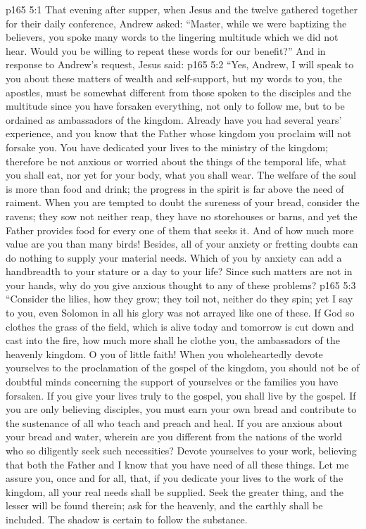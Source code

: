 \vs p165 5:1 That evening after supper, when Jesus and the twelve gathered together for their daily conference, Andrew asked: “Master, while we were baptizing the believers, you spoke many words to the lingering multitude which we did not hear. Would you be willing to repeat these words for our benefit?” And in response to Andrew’s request, Jesus said:
\pc \vs p165 5:2 \textcolor{ubdarkred}{“Yes, Andrew, I will speak to you about these matters of wealth and self\hyp{}support, but my words to you, the apostles, must be somewhat different from those spoken to the disciples and the multitude since you have forsaken everything, not only to follow me, but to be ordained as ambassadors of the kingdom. Already have you had several years’ experience, and you know that the Father whose kingdom you proclaim will not forsake you. You have dedicated your lives to the ministry of the kingdom; therefore be not anxious or worried about the things of the temporal life, what you shall eat, nor yet for your body, what you shall wear. The welfare of the soul is more than food and drink; the progress in the spirit is far above the need of raiment. When you are tempted to doubt the sureness of your bread, consider the ravens; they sow not neither reap, they have no storehouses or barns, and yet the Father provides food for every one of them that seeks it. And of how much more value are you than many birds! Besides, all of your anxiety or fretting doubts can do nothing to supply your material needs. Which of you by anxiety can add a handbreadth to your stature or a day to your life? Since such matters are not in your hands, why do you give anxious thought to any of these problems?}
\vs p165 5:3 \textcolor{ubdarkred}{“Consider the lilies, how they grow; they toil not, neither do they spin; yet I say to you, even Solomon in all his glory was not arrayed like one of these. If God so clothes the grass of the field, which is alive today and tomorrow is cut down and cast into the fire, how much more shall he clothe you, the ambassadors of the heavenly kingdom. O you of little faith! When you wholeheartedly devote yourselves to the proclamation of the gospel of the kingdom, you should not be of doubtful minds concerning the support of yourselves or the families you have forsaken. If you give your lives truly to the gospel, you shall live by the gospel. If you are only believing disciples, you must earn your own bread and contribute to the sustenance of all who teach and preach and heal. If you are anxious about your bread and water, wherein are you different from the nations of the world who so diligently seek such necessities? Devote yourselves to your work, believing that both the Father and I know that you have need of all these things. Let me assure you, once and for all, that, if you dedicate your lives to the work of the kingdom, all your real needs shall be supplied. Seek the greater thing, and the lesser will be found therein; ask for the heavenly, and the earthly shall be included. The shadow is certain to follow the substance.}
